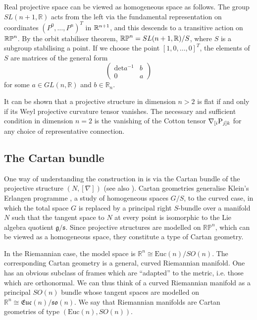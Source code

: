 \begin{rmk}
Real projective space can be viewed as homogeneous space as follows. 
The group $SL(n+1,\mathbb{R})$ acts from the left via the fundamental representation on coordinates $(P^0,\dots,P^n)^T$ in $\mathbb{R}^{n+1}$, and this descends to a transitive action on $\mathbb{RP}^n$. By the orbit stabiliser theorem, $\mathbb{RP}^n=SL(n+1,\mathbb{R})/S$, where $S$ is a subgroup stabilising a point. If we choose the point $[1,0,\dots,0]^T$, the elements of $S$ are matrices of the general form
\[
\begin{pmatrix}\mathrm{det}a^{-1} & b\\
0 & a
\end{pmatrix}
\]
for some $a\in GL(n,\mathbb{R})$ and $b\in\mathbb{R}_{n}$.
\end{rmk} 

\begin{rmk}
It can be shown that a projective structure in dimension $n>2$ is flat if and only if its Weyl projective curvature tensor vanishes. The necessary and sufficient condition in dimension $n=2$ is the vanishing of the Cotton tensor $\nabla_{[i}\mathrm{P}_{j]k}$ for any choice of representative connection.
\end{rmk}

\subsection{The Cartan bundle}

One way of understanding the construction in \cite{DM}
is via the Cartan bundle \cite{Cartan} of the projective structure $(N,[\nabla])$ (see also \cite{KobNag,Sharpe}). Cartan geometries generalise Klein's Erlangen programme \cite{Klein}, a study of homogeneous spaces $G/S$, to the curved case, in which the total space $G$ is replaced by a principal right $S$-bundle over a manifold $N$ such that the tangent space to $N$ at every point is isomorphic to the Lie algebra quotient $\mathfrak{g}/\mathfrak{s}$. Since projective structures are modelled on $\mathbb{RP}^{n}$, which can be viewed as a homogeneous space, they constitute a type of Cartan geometry.

In the Riemannian case, the model space is $\mathbb{R}^{n}\cong\mathrm{Euc}(n)/SO(n)$. The corresponding Cartan geometry is a general, curved Riemannian manifold. One has an obvious subclass of frames which are ``adapted'' to the metric, i.e. those which are orthonormal. We can thus think of a curved Riemannian manifold as a principal $SO(n)$ bundle whose tangent spaces are modelled on $\mathbb{R}^{n}\cong\mathfrak{Euc}(n)/\mathfrak{so}(n)$. We say that Riemannian manifolds are Cartan geometries of type $(\mathrm{Euc}(n),SO(n))$.

